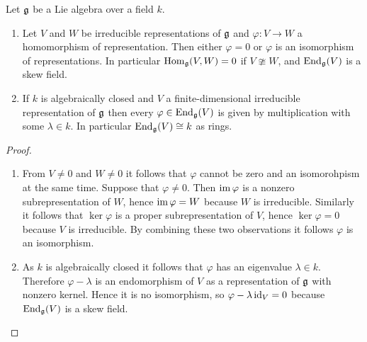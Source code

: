 \begin{lem}[Schur]
 Let $\mathfrak{g}$ be a Lie algebra over a field $k$.
 \begin{enumerate}
  \item
   Let $V$ and $W$ be irreducible representations of $\mathfrak{g}$ and $\varphi \colon V \to W$ a homomorphism of representation. Then either $\varphi = 0$ or $\varphi$ is an isomorphism of representations. In particular $\operatorname{Hom}_{\mathfrak{g}}(V,W) = 0$ if $V \ncong W$, and $\operatorname{End}_{\mathfrak{g}}(V)$ is a skew field.
  \item
   If $k$ is algebraically closed and $V$ a finite-dimensional irreducible representation of $\mathfrak{g}$ then every $\varphi \in \operatorname{End}_{\mathfrak{g}}(V)$ is given by multiplication with some $\lambda \in k$. In particular $\operatorname{End}_{\mathfrak{g}}(V) \cong k$ as rings.
 \end{enumerate}
\end{lem}
\begin{proof}
 \begin{enumerate}[leftmargin=*]
  \item
   From $V \neq 0$ and $W \neq 0$ it follows that $\varphi$ cannot be zero and an isomorohpism at the same time. Suppose that $\varphi \neq 0$. Then $\operatorname{im} \varphi$ is a nonzero subrepresentation of $W$, hence $\operatorname{im} \varphi = W$ because $W$ is irreducible. Similarly it follows that $\ker \varphi$ is a proper subrepresentation of $V$, hence $\ker \varphi = 0$ because $V$ is irreducible. By combining these two observations it follows $\varphi$ is an isomorphism.
  \item
   As $k$ is algebraically closed it follows that $\varphi$ has an eigenvalue $\lambda \in k$. Therefore $\varphi - \lambda$ is an endomorphism of $V$ as a representation of $\mathfrak{g}$ with nonzero kernel. Hence it is no isomorphism, so $\varphi - \lambda \operatorname{id}_V = 0$ because $\operatorname{End}_{\mathfrak{g}}(V)$ is a skew field.
  \qedhere
 \end{enumerate}
\end{proof}







